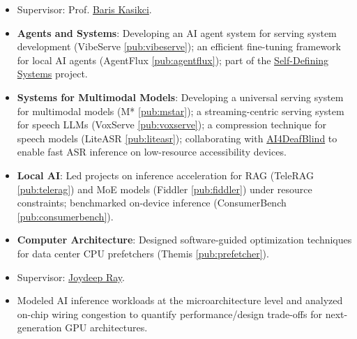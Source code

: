 \documentclass[10pt]{extarticle}
\begin{document}

\begin{itemize}
    \item Supervisor: Prof. \href{http://bariskasikci.org/}{Baris Kasikci}.
    \item \textbf{Agents and Systems}: Developing an AI agent system for serving system development (VibeServe \ref{pub:vibeserve}); an efficient fine-tuning framework for local AI agents (AgentFlux \ref{pub:agentflux}); part of the \href{https://sds.cs.washington.edu/people/}{Self-Defining Systems} project.
    \item \textbf{Systems for Multimodal Models}: Developing a universal serving system for multimodal models (M* \ref{pub:mstar}); a streaming-centric serving system for speech LLMs (VoxServe \ref{pub:voxserve}); a compression technique for speech models (LiteASR \ref{pub:liteasr}); collaborating with \href{https://ai4deafblind.org/}{AI4DeafBlind} to enable fast ASR inference on low-resource accessibility devices.
    \item \textbf{Local AI}: Led projects on inference acceleration for RAG (TeleRAG \ref{pub:telerag}) and MoE models (Fiddler \ref{pub:fiddler}) under resource constraints; benchmarked on-device inference (ConsumerBench \ref{pub:consumerbench}).
    \item \textbf{Computer Architecture}: Designed software-guided optimization techniques for data center CPU prefetchers (Themis \ref{pub:prefetcher}).
\end{itemize}

\begin{itemize}
    \item Supervisor: \href{https://www.linkedin.com/in/joydeep-ray-0563591/}{Joydeep Ray}.
    \item Modeled AI inference workloads at the microarchitecture level and analyzed on-chip wiring congestion to quantify performance/design trade-offs for next-generation GPU architectures.
\end{itemize}
\end{document}

